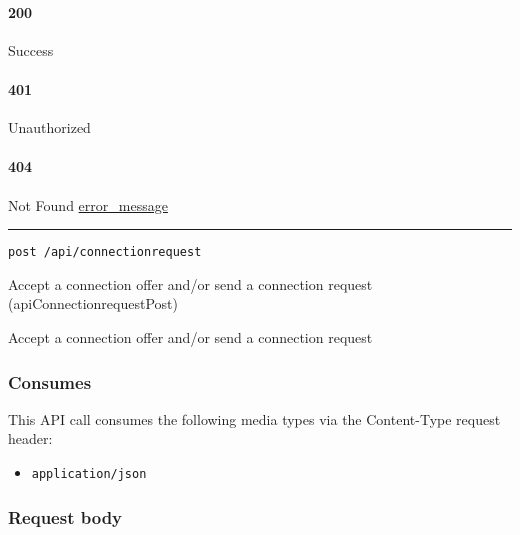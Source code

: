 \hypertarget{section-82}{%
\paragraph{200}\label{section-82}}

Success

\hypertarget{section-83}{%
\paragraph{401}\label{section-83}}

Unauthorized \protect\hyperlink{}{}

\hypertarget{section-84}{%
\paragraph{404}\label{section-84}}

Not Found \protect\hyperlink{error_message}{error\_message}

\begin{center}\rule{0.5\linewidth}{\linethickness}\end{center}

\protect\hypertarget{apiConnectionrequestPost}{}{}

\begin{verbatim}
post /api/connectionrequest
\end{verbatim}

Accept a connection offer and/or send a connection request
({apiConnectionrequestPost})

Accept a connection offer and/or send a connection request

\hypertarget{consumes-7}{%
\subsubsection{Consumes}\label{consumes-7}}

This API call consumes the following media types via the {Content-Type}
request header:

\begin{itemize}
\tightlist
\item
  \texttt{application/json}
\end{itemize}

\hypertarget{request-body-7}{%
\subsubsection{Request body}\label{request-body-7}}


